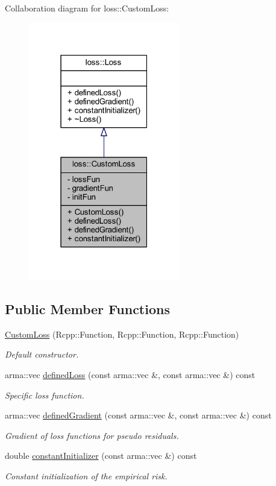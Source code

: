 Collaboration diagram for loss\+:\+:Custom\+Loss\+:\nopagebreak
\begin{figure}[H]
\begin{center}
\leavevmode
\includegraphics[width=187pt]{classloss_1_1_custom_loss__coll__graph}
\end{center}
\end{figure}
\subsection*{Public Member Functions}
\begin{DoxyCompactItemize}
\item 
\mbox{\hyperlink{classloss_1_1_custom_loss_ae3e34f8cab5f6c317412a32f27542f92}{Custom\+Loss}} (Rcpp\+::\+Function, Rcpp\+::\+Function, Rcpp\+::\+Function)
\begin{DoxyCompactList}\small\item\em Default constructor. \end{DoxyCompactList}\item 
arma\+::vec \mbox{\hyperlink{classloss_1_1_custom_loss_a2a96bc5e4b4894bbaa64745a3f7c0fd5}{defined\+Loss}} (const arma\+::vec \&, const arma\+::vec \&) const
\begin{DoxyCompactList}\small\item\em Specific loss function. \end{DoxyCompactList}\item 
arma\+::vec \mbox{\hyperlink{classloss_1_1_custom_loss_a3a79dc019e781c2956b52fb8e1cfcc56}{defined\+Gradient}} (const arma\+::vec \&, const arma\+::vec \&) const
\begin{DoxyCompactList}\small\item\em Gradient of loss functions for pseudo residuals. \end{DoxyCompactList}\item 
double \mbox{\hyperlink{classloss_1_1_custom_loss_adf283025a8511731504cd5b620cc8b37}{constant\+Initializer}} (const arma\+::vec \&) const
\begin{DoxyCompactList}\small\item\em Constant initialization of the empirical risk. \end{DoxyCompactList}\end{DoxyCompactItemize}
